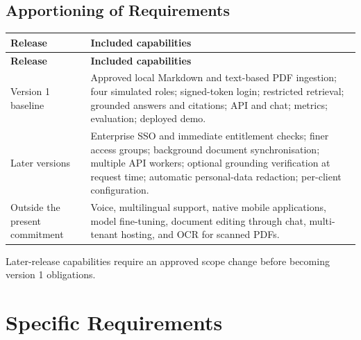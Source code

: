 \documentclass[11pt,letterpaper]{article}
\begin{document}
\subsection{Apportioning of Requirements}

\begingroup\small

\begin{longtable}{|P{\arrayrulewidth\relax}|P{\arrayrulewidth\relax}|}

\hline{}

\textbf{Release} & \textbf{Included capabilities} \\ \hline

\endfirsthead

\hline{}

\textbf{Release} & \textbf{Included capabilities} \\ \hline

\endhead

\hline\endfoot

\hline\endlastfoot

Version 1 baseline & Approved local Markdown and text-based PDF ingestion; four simulated roles; signed-token login; restricted retrieval; grounded answers and citations; API and chat; metrics; evaluation; deployed demo. \\ \hline

Later versions & Enterprise SSO and immediate entitlement checks; finer access groups; background document synchronisation; multiple API workers; optional grounding verification at request time; automatic personal-data redaction; per-client configuration. \\ \hline

Outside the present commitment & Voice, multilingual support, native mobile applications, model fine-tuning, document editing through chat, multi-tenant hosting, and OCR for scanned PDFs. \\ \hline

\end{longtable}

\endgroup

Later-release capabilities require an approved scope change before becoming version 1 obligations.\par

\clearpage

\section{Specific Requirements}
\end{document}
